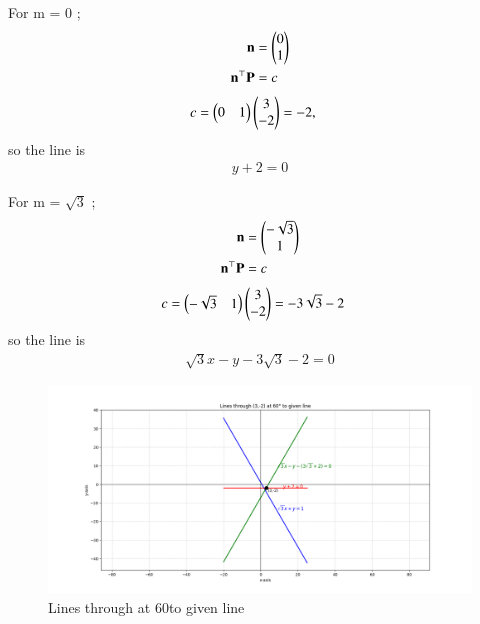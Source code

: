 \documentclass[journal]{IEEEtran}
\begin{document}
For m = 0 ;
\begin{align}
    \mathbf{n} &= \begin{pmatrix}0\\1\end{pmatrix}\\
    \mathbf{n}^\top \mathbf{P} &= c
\end{align}
\begin{align}
    c = \begin{pmatrix}0&1\end{pmatrix}\begin{pmatrix}3\\-2\end{pmatrix}&=-2,
\end{align}
so the line is
\begin{align}
    y+2=0
\end{align}

For m = $\sqrt{3}$ ;
\begin{align}
\mathbf{n} &= \begin{pmatrix}-\sqrt{3}\\1\end{pmatrix}\\
\mathbf{n}^\top \mathbf{P} &= c
\end{align}
\begin{align}
    c = \begin{pmatrix}-\sqrt{3}&1\end{pmatrix}\begin{pmatrix}3\\-2\end{pmatrix} &= -3\sqrt{3}-2
\end{align}
so the line is
\begin{align}
     \sqrt{3}x - y - 3\sqrt{3}-2 = 0
\end{align}

\begin{figure}[h!]
    \centering
    \includegraphics[width=0.655\columnwidth]{figs/pure_python.png}
    \caption{Lines through  at 60\degree to given line}
    \label{fig:fig}
 \end{figure}
\end{document}

